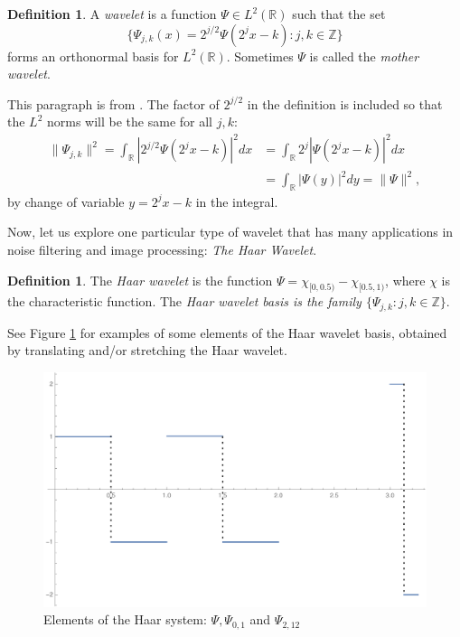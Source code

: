 \documentclass[11pt]{amsart}
\theoremstyle{theorem} %
\theoremstyle{definition}
\newtheorem{defn}[thm]{Definition}
\theoremstyle{example}
\theoremstyle{remark}
\numberwithin{equation}{section}
\newcommand{\R}{\mathbb{R}}
\newcommand{\Z}{\mathbb{Z}}
\begin{document}
\begin{defn} \label{def: wavelet}
	A \emph{wavelet} is a function $ \varPsi \in L^2(\R) $ such that the set
	\[ \{ \varPsi_{j,k}(x) = 2^{j/2} \varPsi (2^j x-k): j,k \in \Z  \} \]
	forms an orthonormal basis for $ L^2(\R) $. Sometimes $ \varPsi $ is called the \emph{mother wavelet}.
\end{defn}

This paragraph is from \cite{frazier}. The factor of $ 2^{j/2} $ in the definition is included so that the $ L^2 $ norms will be the same for all $ j,k $:
		\begin{align*}
			\| \varPsi_{j,k} \|^2 = \int_{\R} \left| 2^{j/2} \varPsi(2^{j} x - k) \right|^2 dx 
			&=   \int_{\R} 2^j \left| \varPsi(2^{j} x - k) \right|^2 dx \\
			&= \int_{\R} \left| \varPsi(y) \right|^2 dy
			= \| \varPsi \|^2,
		\end{align*}
		by change of variable $ y = 2^{j}x-k $ in the integral.
	
Now, let us explore one particular type of wavelet that has many applications in noise filtering and image processing: \emph{The Haar Wavelet}.

\begin{defn}
	The \emph{Haar wavelet} is the function $ \varPsi = \chi_{[0,0.5)} - \chi_{[0.5,1)} $, where $ \chi $ is the characteristic function. The \emph{Haar wavelet basis is the family $ \{ \varPsi_{j,k}:j,k \in \Z \} $}.
\end{defn}
See Figure \ref{fig:haarsystem} for examples of some elements of the Haar wavelet basis, obtained by translating and/or stretching the Haar wavelet. 

\begin{figure}
	\centering
	\includegraphics[width=0.7\linewidth]{img/haar_system}
	\caption[Elements of the Haar system]{Elements of the Haar system: $ \varPsi, \varPsi_{0,1} $ and $ \varPsi_{2,12} $}
	\label{fig:haarsystem}
\end{figure}
\end{document}

